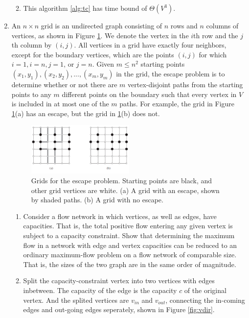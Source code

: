 \documentclass[12pt,a4paper]{article}
\makeatletter
\newtheorem*{solution}{Solution}
\theoremstyle{definition}
\renewenvironment{solution}[1][Solution] {\par\pushQED{\qed}\normalfont\topsep6\p@\@plus6\p@\relax\trivlist\item[\hskip\labelsep\bfseries#1\@addpunct{.}]\ignorespaces}{\popQED\endtrivlist\@endpefalse} \makeatother
\makeatother
\begin{document}
\begin{enumerate}
\begin{enumerate}
\begin{solution}
\begin{tcolorbox}[skin=mycross]
			This algorithm \ref{alg:tc} has time bound of $\Theta(V^3)$.
		\end{tcolorbox}
		\end{solution}
	\end{enumerate}

	\item An $n\times n$ grid is an undirected graph consisting of $n$ rows and $n$ columns of vertices, as shown in Figure \ref{Fig-EscapeProblem}. We denote the vertex in the $i$th row and the $j$th column by $(i,j)$. All vertices in a grid have exactly four neighbors, except for the boundary vertices, which are the points $(i,j)$ for which $i = 1, i = n, j = 1$, or $j = n$.
    Given $m\leqslant n^2$ starting points $(x_1,y_1), (x_2, y_2), ... , (x_m, y_m)$ in the grid, the escape problem is to determine whether or not there are $m$ vertex-disjoint paths from the starting points to any $m$ different points on the boundary such that every vertex in $V$ is included in at most one of the $m$ paths. For example, the grid in Figure \ref{Fig-EscapeProblem}(a) has an escape, but the grid in \ref{Fig-EscapeProblem}(b) does not.
    \begin{figure}[!htbp]
	\centering
	\includegraphics[width=0.5\textwidth]{Fig-EscapeProblem.pdf}
	\caption{Grids for the escape problem. Starting points are black, and other grid vertices are white. (a) A grid with an escape, shown by shaded paths. (b) A grid with no escape.}
	\label{Fig-EscapeProblem}
	\end{figure}
    \begin{enumerate}
        \item Consider a flow network in which vertices, as well as edges, have capacities. That is, the total positive flow entering any given vertex is subject to a capacity constraint. Show that determining the maximum flow in a network with edge and vertex capacities can be reduced to an ordinary maximum-flow problem on a flow network of comparable size. That is, the sizes of the two graph are in the same order of magnitude.
        \begin{solution}
			Split the capacity-constraint vertex into two vertices with edges inbetween. The capacity of the edge is the capacity $c$ of the original vertex. And the splited vertices are $v_{in}$ and $v_{out}$, connecting the in-coming edges and out-going edges seperately, shown in Figure \ref{fig:vdir}.


\end{solution}
\end{enumerate}
\end{enumerate}
\end{document}
